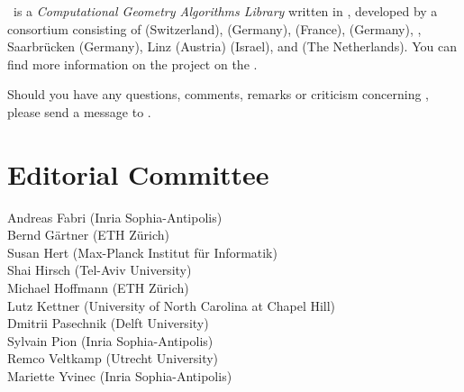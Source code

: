 
\cgal\ is a {\em Computational Geometry Algorithms Library} written in \CC, 
developed by a consortium consisting of
 (Switzerland), 
 (Germany), 
(France),
 (Germany),
,
Saarbr\"ucken (Germany),
 Linz (Austria)
 (Israel), and
 (The Netherlands). 
You can find more information on the project on the 
.

Should you have any questions, comments, remarks or criticism concerning 
\cgal, please send a message to 
.


\section*{Editorial Committee}

Andreas Fabri ({\sc Inria} Sophia-Antipolis) \\
Bernd G\"artner (ETH Z\"urich) \\
Susan Hert (Max-Planck Institut f\"ur Informatik)\\
Shai Hirsch (Tel-Aviv University) \\
Michael Hoffmann (ETH Z\"urich) \\
Lutz Kettner (University of North Carolina at Chapel Hill) \\
Dmitrii Pasechnik (Delft University) \\
Sylvain Pion ({\sc Inria} Sophia-Antipolis)\\
Remco Veltkamp (Utrecht University)\\
Mariette Yvinec ({\sc Inria} Sophia-Antipolis)\\


